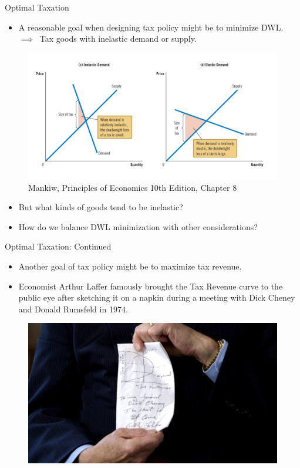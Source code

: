 \documentclass[9pt, handout]{beamer}
\begin{document}
\begin{frame}{Optimal Taxation}
    \begin{itemize}
        \item A reasonable goal when designing tax policy might be to minimize DWL.\\
        $\implies \:$ Tax goods with inelastic demand or supply.
    \end{itemize}
    \begin{figure}
        \centering
        \includegraphics[width=0.8\linewidth]{elasticity_and_dwl.png}
        \caption{Mankiw, Principles of Economics 10th Edition, Chapter 8}
    \end{figure}
    \begin{itemize}
        \item But what kinds of goods tend to be inelastic?
        \item How do we balance DWL minimization with other considerations?
    \end{itemize}
\end{frame}

\begin{frame}{Optimal Taxation: Continued}
    \begin{itemize}
        \item Another goal of tax policy might be to maximize tax revenue.
        \item Economist Arthur Laffer famously brought the Tax Revenue curve to the public eye after sketching it on a napkin during a meeting with Dick Cheney and Donald Rumsfeld in 1974.
    \end{itemize}
    \begin{figure}
        \centering
        \includegraphics[width=.85\linewidth]{laffer curve.jpg}
    \end{figure}
\end{frame}
\end{document}
